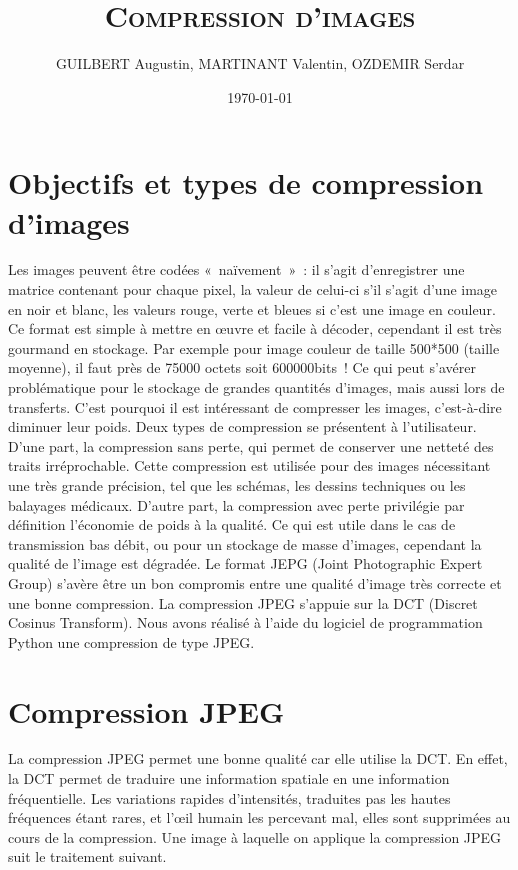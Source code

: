 \documentclass[12pt]{article}
\author{GUILBERT Augustin, MARTINANT Valentin, OZDEMIR Serdar}
\date{\today}
\title{\textsc{\textbf{Compression d'images}}}
\begin{document}
\maketitle
\newpage
\tableofcontents
\newpage
\section{Objectifs et types de compression d'images}	
Les images peuvent être codées « naïvement » : il s’agit d’enregistrer une matrice contenant pour chaque pixel, la valeur de celui-ci s’il s’agit d’une image en noir et blanc, les valeurs rouge, verte et bleues si c’est une image en couleur. Ce format est simple à mettre en œuvre et facile à décoder, cependant il est très gourmand en stockage.  Par exemple pour image couleur de taille 500*500 (taille moyenne), il faut près de 75000 octets soit 600000bits ! Ce qui peut s’avérer problématique pour le stockage de grandes quantités d’images, mais aussi lors de transferts. C’est pourquoi il est intéressant de compresser les images, c’est-à-dire diminuer leur poids. Deux types de compression se présentent à l’utilisateur.
D’une part, la compression sans perte, qui permet de conserver une netteté des traits irréprochable. Cette compression est utilisée pour des images nécessitant une très grande précision, tel que les schémas, les dessins techniques ou les balayages médicaux.
D’autre part, la compression avec perte privilégie par définition l’économie de poids à la qualité. Ce qui est utile dans le cas de transmission bas débit, ou pour un stockage de masse d’images, cependant la qualité de l’image est dégradée. Le format JEPG (Joint Photographic Expert Group) s’avère être un bon compromis entre une qualité d’image très correcte et une bonne compression. La compression JPEG s’appuie sur la DCT (Discret Cosinus Transform).
Nous avons réalisé à l’aide du logiciel de programmation Python une compression de type JPEG.


\newpage
\section{Compression JPEG}
La compression JPEG permet une bonne qualité car elle utilise la DCT. En effet, la DCT permet de traduire une information spatiale en une information fréquentielle. Les variations rapides d’intensités, traduites pas les hautes fréquences étant rares, et l’œil humain les percevant mal, elles sont supprimées au cours de la compression. Une image à laquelle on applique la compression JPEG suit le traitement suivant.
\end{document}
